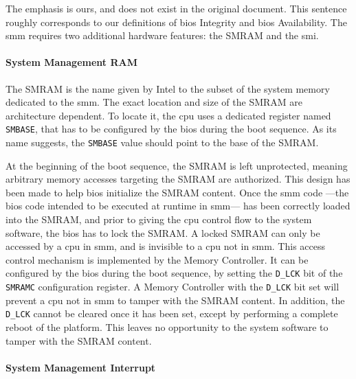 The emphasis is ours, and does not exist in the original document. 
%
This sentence roughly  corresponds to our definitions of \ac{bios} Integrity and
\ac{bios} Availability.
%
The \ac{smm} requires two additional hardware features: the SMRAM and the
\ac{smi}.

\paragraph{System Management RAM}
%
The SMRAM is the name given by Intel to the subset of the system memory
dedicated to the \ac{smm}.
%
The exact location and size of the SMRAM are architecture dependent.
%
To locate it, the \ac{cpu} uses a dedicated register named \texttt{SMBASE}, that has to be
configured by the \ac{bios} during the boot sequence.
%
As its name suggests, the \texttt{SMBASE} value should point to the base of the
SMRAM. 

At the beginning of the boot sequence, the SMRAM is left unprotected, meaning
arbitrary memory accesses targeting the SMRAM are authorized.
%
This design has been made to help \ac{bios} initialize the SMRAM content.
%
Once the \ac{smm} code ---the \ac{bios} code intended to be executed at runtime
in \ac{smm}--- has been correctly loaded into the SMRAM, and prior to giving the
\ac{cpu} control flow to the system software, the \ac{bios} has to lock the
SMRAM.
%
A locked SMRAM can only be accessed by a \ac{cpu} in \ac{smm}, and is invisible
to a \ac{cpu} not in \ac{smm}.
%
This access control mechanism is implemented by the Memory Controller.
%
It can be configured by the \ac{bios} during the boot sequence, by setting the
\texttt{D\_LCK} bit of the \texttt{SMRAMC} configuration register.
%
A Memory Controller with the \texttt{D\_LCK} bit set will prevent a \ac{cpu} not
in \ac{smm} to tamper with the SMRAM content.
%
In addition, the \texttt{D\_LCK} cannot be cleared once it has been set, except
by performing a complete reboot of the platform.
%
This leaves no opportunity to the system software to tamper with the SMRAM
content.

\paragraph{System Management Interrupt}


